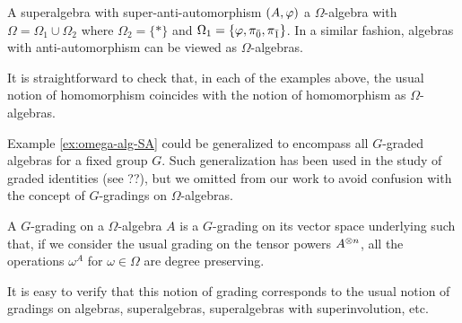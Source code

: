 
\begin{ex}
    A superalgebra with super-anti-automorphism $(A, \varphi)$ a $\Omega$-algebra with $\Omega = \Omega_1 \cup \Omega_2$ where $\Omega_2 = \{ * \}$ and $\Omega_1 = \{ \varphi, \pi_{\bar 0}, \pi_{\bar 1} \}$. 
    In a similar fashion, algebras with anti-automorphism can be viewed as $\Omega$-algebras.
\end{ex}

It is straightforward to check that, in each of the examples above, the usual notion of homomorphism coincides with the notion of homomorphism as $\Omega$-algebras.

\begin{remark}
    Example \ref{ex:omega-alg-SA} could be generalized to encompass all $G$-graded algebras for a fixed group $G$. 
    Such generalization has been used in the study of graded identities (see ??), but we omitted from our work to avoid confusion with the concept of $G$-gradings on $\Omega$-algebras.
\end{remark}

\begin{defi}
    A $G$-grading on a $\Omega$-algebra $A$ is a $G$-grading on its vector space underlying such that, if we consider the usual grading on the tensor powers $A^{\otimes n}$, all the operations $\omega^A$ for $\omega \in \Omega$ are degree preserving.
\end{defi}

It is easy to verify that this notion of grading corresponds to the usual notion of gradings on algebras, superalgebras, superalgebras with superinvolution, etc.


